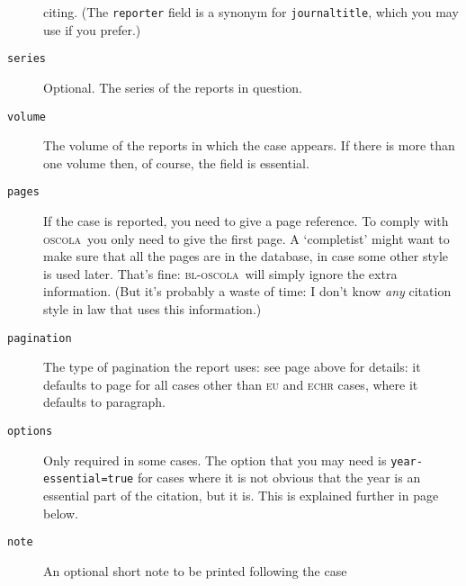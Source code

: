 \documentclass[a4paper,
               11pt,
	       DIV=1,			   
	       footinclude=false]
	      {scrartcl}
\newcommand{\oscola}{\textsc{bl-oscola}}
\newcommand{\oscolashort}{\textsc{oscola}\nocite{oscola}}
\begin{document}
\begin{description}
  citing. (The \texttt{reporter}  field is a synonym for
  \texttt{journaltitle}, which you may use if you prefer.)
\item[\texttt{series}]
Optional. The series of the reports in
  question.
\item[\texttt{volume}]
The volume of the reports in which the case
  appears. If there is more than one volume then, of course, the field
  is essential.
\item[\texttt{pages}]
If the case is reported, you need to give a page
  reference. To comply with \oscolashort\ you only need to give
  the first page. A `completist' might want to make sure that all the
  pages are in the database, in case some other style is used
  later. That's fine: \oscola\ will simply ignore the extra
  information. (But it's probably a waste of time: I don't know
  \emph{any} citation style in law that uses this information.)
\item[\texttt{pagination}]
The type of pagination the report uses: see
  page \pageref{pagination} above for details: it defaults to page for
  all cases other than \textsc{eu} and \textsc{echr} cases, where it
  defaults to paragraph.
\item[\texttt{options}] 
Only required in some cases. The option
  that you may need is \texttt{year-essential=true}
  for cases where it is not obvious that the year is an essential
  part of the citation, but it is. This is explained further in
  page \pageref{yearoptional} below.
\item[\texttt{note}]
An optional short note to be printed following the case

\end{description}
\end{document}
